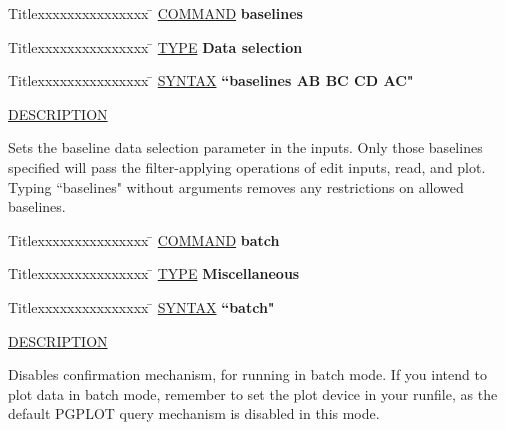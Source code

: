 \vspace{.2in}

\begin{tabbing}
Titlexxxxxxxxxxxxxxx \= \kill
\underline{COMMAND} \> {\bf 	baselines} \\
\end{tabbing}

\begin{tabbing}
Titlexxxxxxxxxxxxxxx \= \kill
\underline{TYPE} \> {\bf 		Data selection} \\
\end{tabbing}

\begin{tabbing}
Titlexxxxxxxxxxxxxxx \= \kill
\underline{SYNTAX} \> {\bf 		``baselines AB BC CD AC"} \\
\end{tabbing}

\underline{DESCRIPTION}
\begin{list}{}{\setlength{\leftmargin}{0.5in}
     \setlength{\rightmargin}{0in}}
\item
Sets the baseline data selection parameter in the inputs.  Only
those baselines specified will pass the filter-applying operations
of edit inputs, read, and plot.  Typing ``baselines" without
arguments removes any restrictions on allowed baselines.
\end{list}
\vspace{.2in}

\begin{tabbing}
Titlexxxxxxxxxxxxxxx \= \kill
\underline{COMMAND} \> {\bf 	batch} \\
\end{tabbing}

\begin{tabbing}
Titlexxxxxxxxxxxxxxx \= \kill
\underline{TYPE} \> {\bf 		Miscellaneous} \\
\end{tabbing}

\begin{tabbing}
Titlexxxxxxxxxxxxxxx \= \kill
\underline{SYNTAX} \> {\bf 		``batch"} \\
\end{tabbing}

\underline{DESCRIPTION}
\begin{list}{}{\setlength{\leftmargin}{0.5in}
     \setlength{\rightmargin}{0in}}
\item
Disables confirmation mechanism, for running in batch mode.
If you intend to plot data in batch mode, remember to set
the plot device in your runfile, as the default PGPLOT query
mechanism is disabled in this mode.
\end{list}
\vspace{.2in}

